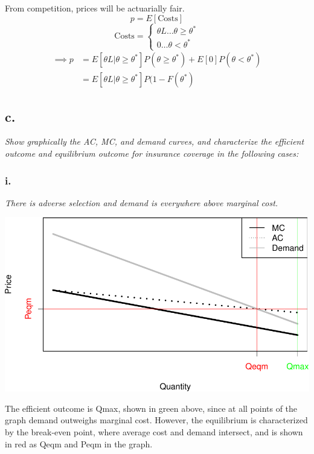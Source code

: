 \documentclass[
]{article}
\begin{document}
From competition, prices will be actuarially fair.
\[ p = E[\text{Costs}]\]
\[\text{Costs} = \begin{cases} \theta L \dots \theta \geq \theta ^ * \\
0 \dots \theta < \theta ^ * \end{cases}\] \[\begin{aligned} 
\implies p &= E[\theta L | \theta \geq \theta ^*] P( \theta \geq \theta ^ *) + E[0]P(\theta < \theta ^ *) \\
 &= E[\theta L|\theta \geq \theta ^ *] P(1 - F(\theta ^ *)
\end{aligned}\]

\hypertarget{c.}{%
\subsection{c.~}\label{c.}}

\textit{Show graphically the AC, MC, and demand curves, and characterize the efficient outcome and equilibrium outcome for insurance coverage in the following cases:}

\hypertarget{i.}{%
\subsubsection{i.}\label{i.}}

\textit{There is adverse selection and demand is everywhere above marginal cost.}

\includegraphics{Pset1_files/figure-latex/unnamed-chunk-2-1.pdf}

The efficient outcome is Qmax, shown in green above, since at all points
of the graph demand outweighs marginal cost. However, the equilibrium is
characterized by the break-even point, where average cost and demand
intersect, and is shown in red as Qeqm and Peqm in the graph.
\end{document}

